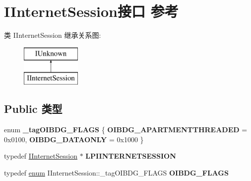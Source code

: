 \hypertarget{interface_i_internet_session}{}\section{I\+Internet\+Session接口 参考}
\label{interface_i_internet_session}
类 I\+Internet\+Session 继承关系图\+:\begin{figure}[H]
\begin{center}
\leavevmode
\includegraphics[height=2.000000cm]{interface_i_internet_session}
\end{center}
\end{figure}
\subsection*{Public 类型}
\begin{DoxyCompactItemize}
\item 
\mbox{\label{interface_i_internet_session_a377004fe6e739124b1a1e259ef84a7c1}} 
enum {\bfseries \+\_\+tag\+O\+I\+B\+D\+G\+\_\+\+F\+L\+A\+GS} \{ {\bfseries O\+I\+B\+D\+G\+\_\+\+A\+P\+A\+R\+T\+M\+E\+N\+T\+T\+H\+R\+E\+A\+D\+ED} = 0x0100, 
{\bfseries O\+I\+B\+D\+G\+\_\+\+D\+A\+T\+A\+O\+N\+LY} = 0x1000
 \}
\item 
\mbox{\label{interface_i_internet_session_a94034557527ba9faa6349a5b5114e538}} 
typedef \hyperlink{interface_i_internet_session}{I\+Internet\+Session} $\ast$ {\bfseries L\+P\+I\+I\+N\+T\+E\+R\+N\+E\+T\+S\+E\+S\+S\+I\+ON}
\item 
\mbox{\label{interface_i_internet_session_a951601e012b447929dcd0b61df5290f1}} 
typedef \hyperlink{interfaceenum}{enum} I\+Internet\+Session\+::\+\_\+tag\+O\+I\+B\+D\+G\+\_\+\+F\+L\+A\+GS {\bfseries O\+I\+B\+D\+G\+\_\+\+F\+L\+A\+GS}
\end{DoxyCompactItemize}

